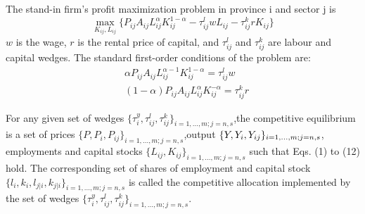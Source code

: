 \documentclass{article}
\begin{document}
The stand-in firm’s profit maximization problem in province i and sector j is
\begin{equation*}
    \max_{K_{ij},L_{ij}} \{ P_{ij}A_{ij}L_{ij}^{\alpha}K_{ij}^{1-\alpha}-\tau_{ij}^l w L_{ij}-\tau_{ij}^k r K_{ij} \}
\end{equation*}
$w$ is the wage, $r$ is the rental price of capital, and $\tau_{ij}^l$ and $\tau_{ij}^k$ are labour and capital wedges. The standard first-order conditions of the problem are:
\begin{align}
    &\alpha P_{ij}A_{ij}L_{ij}^{\alpha-1}K_{ij}^{1-\alpha}=\tau_{ij}^l w\\
    &(1-\alpha)P_{ij}A_{ij}L_{ij}^\alpha K_{ij}^{-\alpha}=\tau_{ij}^k r
\end{align}

\begin{de}
    For any given set of wedges $\{\tau_i^y, \tau_{ij}^l, \tau_{ij}^k\}_ {i=1,\dots,m; j=n,s}$,the competitive equilibrium is a set of prices
    $\{P, P_i , P_{ij}\}_{i=1,\dots,m; j=n,s}$,output $\{Y, Y_i , Y_{ij}\}\\_{i=1,\dots,m; j=n,s}$, employments and capital stocks $\{L_{ij}, K_{ij}\}_{i=1,\dots,m; j=n,s}$ such that Eqs. (1) to (12) hold. The corresponding set of shares of employment and capital stock $\{l_i,k_i, l_{j|i},k_{j|i}\}_{i=1,...,m; j=n,s}$ is called the competitive allocation implemented by the set of wedges $\{ \tau_i^y, \tau_{ij}^l, \tau_{ij}^k\}_{i=1,\dots,m; j=n,s}$.
\end{de}
\end{document}
